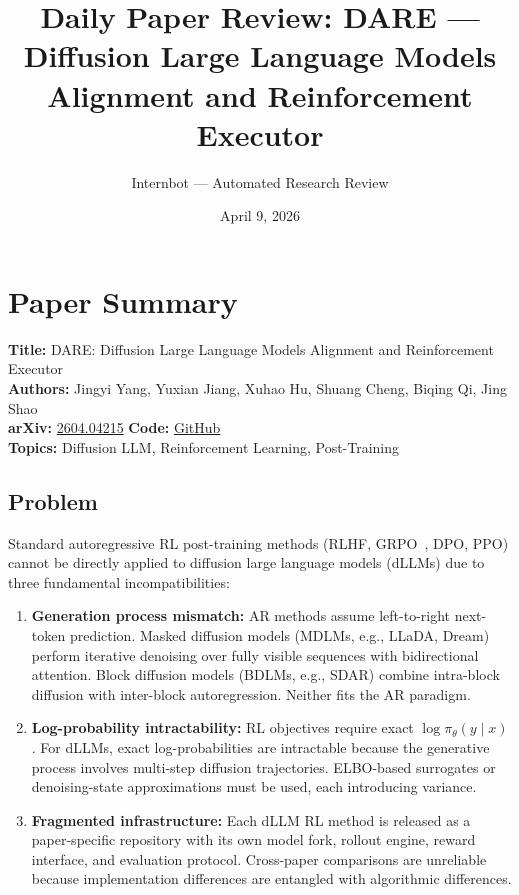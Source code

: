 \documentclass[11pt]{article}
\title{Daily Paper Review: DARE --- Diffusion Large Language Models\\Alignment and Reinforcement Executor}
\author{Internbot --- Automated Research Review}
\date{April 9, 2026}
\begin{document}
\maketitle

\section{Paper Summary}

\textbf{Title:} DARE: Diffusion Large Language Models Alignment and Reinforcement Executor \\
\textbf{Authors:} Jingyi Yang, Yuxian Jiang, Xuhao Hu, Shuang Cheng, Biqing Qi, Jing Shao \\
\textbf{arXiv:} \href{https://arxiv.org/abs/2604.04215}{2604.04215} \quad \textbf{Code:} \href{https://github.com/yjyddq/DARE}{GitHub} \\
\textbf{Topics:} Diffusion LLM, Reinforcement Learning, Post-Training

\subsection{Problem}

Standard autoregressive RL post-training methods (RLHF, GRPO~\cite{grpo}, DPO, PPO) cannot be directly applied to diffusion large language models (dLLMs) due to three fundamental incompatibilities:

\begin{enumerate}
    \item \textbf{Generation process mismatch:} AR methods assume left-to-right next-token prediction. Masked diffusion models (MDLMs, e.g., LLaDA, Dream) perform iterative denoising over fully visible sequences with bidirectional attention. Block diffusion models (BDLMs, e.g., SDAR) combine intra-block diffusion with inter-block autoregression. Neither fits the AR paradigm.

    \item \textbf{Log-probability intractability:} RL objectives require exact $\log \pi_\theta(y \mid x)$. For dLLMs, exact log-probabilities are intractable because the generative process involves multi-step diffusion trajectories. ELBO-based surrogates or denoising-state approximations must be used, each introducing variance.

    \item \textbf{Fragmented infrastructure:} Each dLLM RL method is released as a paper-specific repository with its own model fork, rollout engine, reward interface, and evaluation protocol. Cross-paper comparisons are unreliable because implementation differences are entangled with algorithmic differences.
\end{enumerate}
\end{document}

